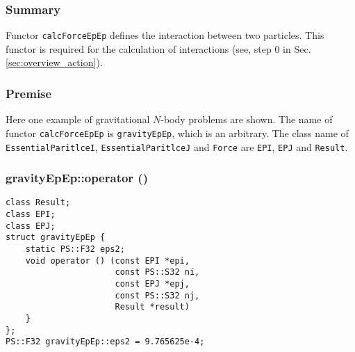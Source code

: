 \subsubsection{Summary}

Functor \texttt{calcForceEpEp} defines the interaction between two particles.
This functor is required for the calculation of interactions (see, step 0 in Sec. \ref{sec:overview_action}).

\subsubsection{Premise}

Here one example of gravitational $N$-body problems are shown.
The name of functor \texttt{calcForceEpEp} is \texttt{gravityEpEp}, which is an arbitrary.
The class name of \texttt{EssentialParitlceI}, \texttt{EssentialParitlceJ} and \texttt{Force} are \texttt{EPI}, \texttt{EPJ} and \texttt{Result}.

\subsubsection{gravityEpEp::operator ()}

\begin{lstlisting}[caption=calcForceEpEp]
class Result;
class EPI;
class EPJ;
struct gravityEpEp {
    static PS::F32 eps2;
    void operator () (const EPI *epi,
                      const PS::S32 ni,
                      const EPJ *epj,
                      const PS::S32 nj,
                      Result *result)
    }
};
PS::F32 gravityEpEp::eps2 = 9.765625e-4;
\end{lstlisting}

